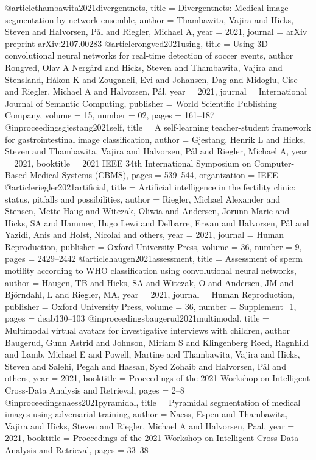 @article{thambawita2021divergentnets,
	title = {Divergentnets: Medical image segmentation by network ensemble},
	author = {Thambawita, Vajira and Hicks, Steven and Halvorsen, P{\aa}l and Riegler, Michael A},
	year = 2021,
	journal = {arXiv preprint arXiv:2107.00283}
}
@article{rongved2021using,
	title = {Using 3D convolutional neural networks for real-time detection of soccer events},
	author = {Rongved, Olav A Nerg{\aa}rd and Hicks, Steven and Thambawita, Vajira and Stensland, H{\aa}kon K and Zouganeli, Evi and Johansen, Dag and Midoglu, Cise and Riegler, Michael A and Halvorsen, P{\aa}l},
	year = 2021,
	journal = {International Journal of Semantic Computing},
	publisher = {World Scientific Publishing Company},
	volume = 15,
	number = {02},
	pages = {161--187}
}
@inproceedings{gjestang2021self,
	title = {A self-learning teacher-student framework for gastrointestinal image classification},
	author = {Gjestang, Henrik L and Hicks, Steven and Thambawita, Vajira and Halvorsen, P{\aa}l and Riegler, Michael A},
	year = 2021,
	booktitle = {2021 IEEE 34th International Symposium on Computer-Based Medical Systems (CBMS)},
	pages = {539--544},
	organization = {IEEE}
}
@article{riegler2021artificial,
	title = {Artificial intelligence in the fertility clinic: status, pitfalls and possibilities},
	author = {Riegler, Michael Alexander and Stensen, Mette Haug and Witczak, Oliwia and Andersen, Jorunn Marie and Hicks, SA and Hammer, Hugo Lewi and Delbarre, Erwan and Halvorsen, P{\aa}l and Yazidi, Anis and Holst, Nicolai and others},
	year = 2021,
	journal = {Human Reproduction},
	publisher = {Oxford University Press},
	volume = 36,
	number = 9,
	pages = {2429--2442}
}
@article{haugen2021assessment,
	title = {Assessment of sperm motility according to WHO classification using convolutional neural networks},
	author = {Haugen, TB and Hicks, SA and Witczak, O and Andersen, JM and Bj{\"o}rndahl, L and Riegler, MA},
	year = 2021,
	journal = {Human Reproduction},
	publisher = {Oxford University Press},
	volume = 36,
	number = {Supplement\_1},
	pages = {deab130--103}
}
@inproceedings{baugerud2021multimodal,
	title = {Multimodal virtual avatars for investigative interviews with children},
	author = {Baugerud, Gunn Astrid and Johnson, Miriam S and Klingenberg R{\o}ed, Ragnhild and Lamb, Michael E and Powell, Martine and Thambawita, Vajira and Hicks, Steven and Salehi, Pegah and Hassan, Syed Zohaib and Halvorsen, P{\aa}l and others},
	year = 2021,
	booktitle = {Proceedings of the 2021 Workshop on Intelligent Cross-Data Analysis and Retrieval},
	pages = {2--8}
}
@inproceedings{naess2021pyramidal,
	title = {Pyramidal segmentation of medical images using adversarial training},
	author = {Naess, Espen and Thambawita, Vajira and Hicks, Steven and Riegler, Michael A and Halvorsen, Paal},
	year = 2021,
	booktitle = {Proceedings of the 2021 Workshop on Intelligent Cross-Data Analysis and Retrieval},
	pages = {33--38}
}
